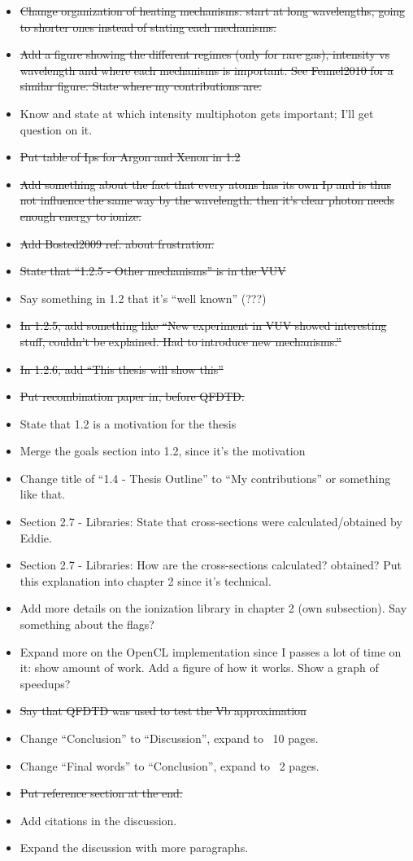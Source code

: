 \begin{itemize}
\item \sout{Change organization of heating mechanisms: start at long wavelengths, going
to shorter ones instead of stating each mechanisms.}
\item \sout{Add a figure showing the different regimes (only for rare gas), intensity
vs wavelength and where each mechanisms is important. See Fennel2010 for a
similar figure. State where my contributions are.}
\item Know and state at which intensity multiphoton gets important; I'll get
question on it.
\item \sout{Put table of Ips for Argon and Xenon in 1.2}
\item \sout{Add something about the fact that every atoms has its own Ip and is thus
not influence the same way by the wavelength: then it's clear photon needs
enough energy to ionize.}
\item \sout{Add Bosted2009 ref. about frustration.}
\item \sout{State that ``1.2.5 - Other mechanisms'' is in the VUV}
\item Say something in 1.2 that it's ``well known'' (???)
\item \sout{In 1.2.5, add something like ``New experiment in VUV showed interesting
stuff, couldn't be explained. Had to introduce new mechanisms.''}
\item \sout{In 1.2.6, add ``This thesis will show this''}
\item \sout{Put recombination paper in, before QFDTD.}
\item State that 1.2 is a motivation for the thesis
\item Merge the goals section into 1.2, since it's the motivation
\item Change title of ``1.4 - Thesis Outline'' to ``My contributions'' or
something like that.
\item Section 2.7 - Libraries: State that cross-sections were calculated/obtained
by Eddie.
\item Section 2.7 - Libraries: How are the cross-sections calculated? obtained?
Put this explanation into chapter 2 since it's technical.
\item Add more details on the ionization library in chapter 2 (own subsection).
Say something about the flags?
\item Expand more on the OpenCL implementation since I passes a lot of time on
it: show amount of work. Add a figure of how it works. Show a graph of speedups?
\item \sout{Say that QFDTD was used to test the Vb approximation}
\item Change ``Conclusion'' to ``Discussion'', expand to ~10 pages.
\item Change ``Final words'' to ``Conclusion'', expand to ~2 pages.
\item \sout{Put reference section at the end.}
\item Add citations in the discussion.
\item Expand the discussion with more paragraphs.
\end{itemize}

